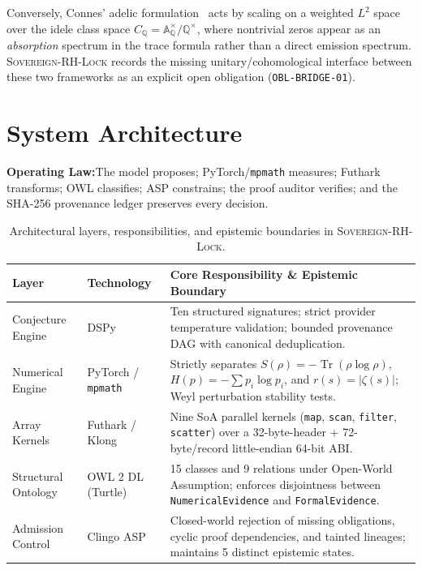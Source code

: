 \documentclass[11pt,letterpaper]{article}
\newcommand{\takeaway}[2]{%
  \vspace{6pt}\noindent\colorbox{primary!8}{%
    \parbox{\dimexpr\linewidth-2\fboxsep\relax}{%
      \vspace{3pt}\textbf{\color{primary}#1:}\hspace{0.5em}#2\vspace{3pt}%
    }%
  }\vspace{6pt}%
}
\begin{document}
Conversely, Connes' adelic formulation~\cite{connes1999} acts by scaling on a weighted $L^2$ space over the idele class space $C_\mathbb{Q} = \mathbb{A}_\mathbb{Q}^\times / \mathbb{Q}^\times$, where nontrivial zeros appear as an \emph{absorption} spectrum in the trace formula rather than a direct emission spectrum. \textsc{Sovereign-RH-Lock} records the missing unitary/cohomological interface between these two frameworks as an explicit open obligation (\texttt{OBL-BRIDGE-01}).

\section{System Architecture}

\takeaway{Operating Law}{The model proposes; PyTorch/\texttt{mpmath} measures; Futhark transforms; OWL classifies; ASP constrains; the proof auditor verifies; and the SHA-256 provenance ledger preserves every decision.}

\begin{table}[!htbp]
\centering
\caption{Architectural layers, responsibilities, and epistemic boundaries in \textsc{Sovereign-RH-Lock}.}
\label{tab:layers}
\begin{tabularx}{\linewidth}{llX}
\toprule
\textbf{Layer} & \textbf{Technology} & \textbf{Core Responsibility \& Epistemic Boundary} \\
\midrule
Conjecture Engine & DSPy & Ten structured signatures; strict provider temperature validation; bounded provenance DAG with canonical deduplication. \\
Numerical Engine & PyTorch / \texttt{mpmath} & Strictly separates $S(\rho) = -\operatorname{Tr}(\rho\log\rho)$, $H(p) = -\sum p_i\log p_i$, and $r(s) = |\zeta(s)|$; Weyl perturbation stability tests. \\
Array Kernels & Futhark / Klong & Nine SoA parallel kernels (\texttt{map}, \texttt{scan}, \texttt{filter}, \texttt{scatter}) over a 32-byte-header + 72-byte/record little-endian 64-bit ABI. \\
Structural Ontology & OWL 2 DL (Turtle) & 15 classes and 9 relations under Open-World Assumption; enforces disjointness between \texttt{NumericalEvidence} and \texttt{FormalEvidence}. \\
Admission Control & Clingo ASP & Closed-world rejection of missing obligations, cyclic proof dependencies, and tainted lineages; maintains 5 distinct epistemic states. \\
\bottomrule
\end{tabularx}
\end{table}
\end{document}
